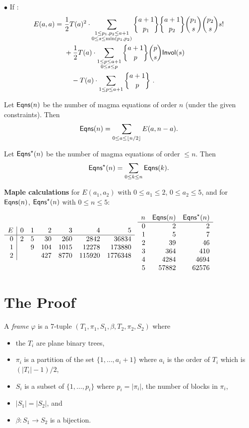 \documentclass[12pt]{amsart}
\newcommand{\Invol}{{\sf Invol}}
\newcommand{\Eqns}{{\sf Eqns}}
\begin{document}
$\bullet$ If : 
\begin{align*}
E(a,a) =\ &\frac{1}{2} T(a)^2\cdot \sum_{\substack{1 \le p_1,p_2 \le a+1\\ 0\le s \le \min(p_1,p_2)}} 
{a+1 \brace p_1} {a+1 \brace p_2} {p_1 \choose s} {p_2 \choose s} s! \\
&+ \frac{1}{2} T(a) \cdot \sum_{\substack{1 \le p \le a+1\\ 0\le s \le p}} 
{a+1 \brace p}  {p \choose s}  \Invol(s)\\
&\quad - T(a)\cdot \sum_{1\le p \le a+1}  {a+1 \brace p} \ .
\end{align*}

Let $\Eqns(n)$ be the number of magma equations of order $n$ (under the given constraints). Then
$$
\Eqns (n) = \sum_{0 \le a \le \lfloor n/2 \rfloor } E(a,n-a) .
$$

Let $\Eqns^\star(n)$ be the number of magma equations of order $\le n$. Then
$$
\Eqns^\star(n) = \sum_{0 \le k \le n} \Eqns (k) .
$$

{\bf Maple calculations} for $E(a_1,a_2)$ with $0\le a_1 \le 2$, $0 \le a_2 \le 5$, and for
$\Eqns(n)$, $\Eqns^\star(n)$ with $0\le n \le 5$:
\bigskip

$
\begin{array}{ r | r  r  r  r  r  r}
E& 0 & 1 & 2 & 3 & 4 & 5\\
\hline
0& 2 & 5 & 30 & 260 & 2842 & 36834\\
1&  & 9 & 104 & 1015 & 12278 & 173880\\
2&  &  & 427 & 8770 & 115920 & 1776348\\
\end{array}
$
\qquad
$
\begin{array} {r r r}
n &\Eqns(n) & \Eqns^\star(n)\\
\hline
0 & 2 & 2\\
1 & 5 & 7\\
2 & 39 & 46\\
3 & 364 & 410\\
4 & 4284 & 4694\\
5 & 57882 & 62576
\end{array}
$
\newpage

\section{The Proof}

A {\em frame} $\varphi$ is a 7-tuple $(T_1,\pi_1,S_1, \beta, T_2, \pi_2, S_2)$ where 
\begin{itemize} 
\item the $T_i$ are plane binary trees, 
\item $\pi_i$ is a partition of the set $\{1,\ldots,a_i + 1\}$ where $a_i$ is the 
order of $T_i$ which is $(|T_i| -1)/2$,
\item $S_i$ is a subset of $\{1,\ldots,p_i\}$ where $p_i = |\pi_i|$, the number of blocks in $\pi_i$,
\item $|S_1| = |S_2|$, and
\item $\beta : S_1 \rightarrow S_2$ is a bijection.
\end{itemize}
\end{document}
